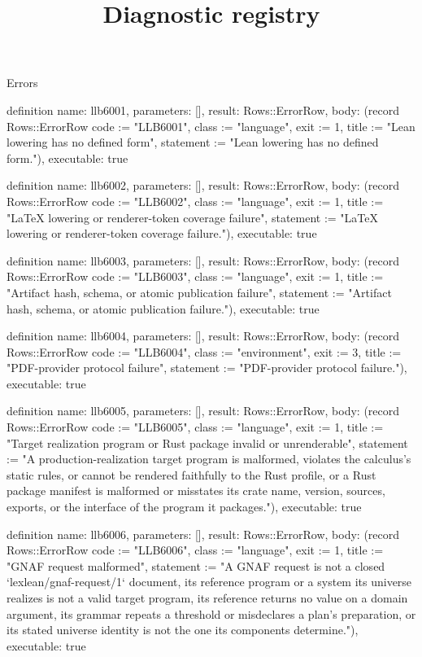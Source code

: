 \begin{lexlean}{Errors}
\title{Diagnostic registry}
\begin{semanticmodule}
definition{
  name: llb6001,
  parameters: [],
  result: Rows::ErrorRow,
  body: (record Rows::ErrorRow {code := "LLB6001", class := "language", exit := 1, title := "Lean lowering has no defined form", statement := "Lean lowering has no defined form."}),
  executable: true
}

definition{
  name: llb6002,
  parameters: [],
  result: Rows::ErrorRow,
  body: (record Rows::ErrorRow {code := "LLB6002", class := "language", exit := 1, title := "LaTeX lowering or renderer-token coverage failure", statement := "LaTeX lowering or renderer-token coverage failure."}),
  executable: true
}

definition{
  name: llb6003,
  parameters: [],
  result: Rows::ErrorRow,
  body: (record Rows::ErrorRow {code := "LLB6003", class := "language", exit := 1, title := "Artifact hash, schema, or atomic publication failure", statement := "Artifact hash, schema, or atomic publication failure."}),
  executable: true
}

definition{
  name: llb6004,
  parameters: [],
  result: Rows::ErrorRow,
  body: (record Rows::ErrorRow {code := "LLB6004", class := "environment", exit := 3, title := "PDF-provider protocol failure", statement := "PDF-provider protocol failure."}),
  executable: true
}

definition{
  name: llb6005,
  parameters: [],
  result: Rows::ErrorRow,
  body: (record Rows::ErrorRow {code := "LLB6005", class := "language", exit := 1, title := "Target realization program or Rust package invalid or unrenderable", statement := "A production-realization target program is malformed, violates the calculus's static rules, or cannot be rendered faithfully to the Rust profile, or a Rust package manifest is malformed or misstates its crate name, version, sources, exports, or the interface of the program it packages."}),
  executable: true
}

definition{
  name: llb6006,
  parameters: [],
  result: Rows::ErrorRow,
  body: (record Rows::ErrorRow {code := "LLB6006", class := "language", exit := 1, title := "GNAF request malformed", statement := "A GNAF request is not a closed `lexlean/gnaf-request/1` document, its reference program or a system its universe realizes is not a valid target program, its reference returns no value on a domain argument, its grammar repeats a threshold or misdeclares a plan's preparation, or its stated universe identity is not the one its components determine."}),
  executable: true
}


\end{semanticmodule}
\end{lexlean}
